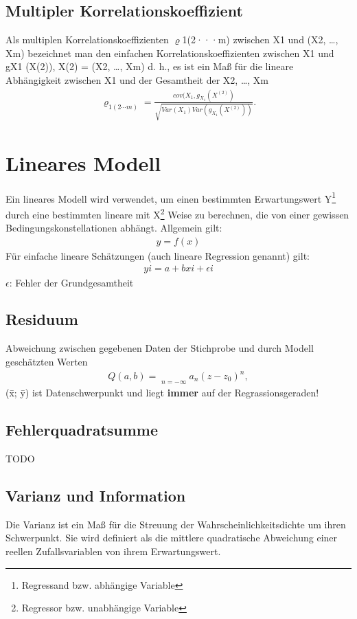 \documentclass[a4paper,10pt]{scrartcl}
\begin{document}
\subsection{Multipler Korrelationskoeffizient}
Als multiplen Korrelationskoeffizienten $\varrho$1(2···m) zwischen X1 und (X2, …, Xm) bezeichnet man den einfachen Korrelationskoeffizienten zwischen X1 und gX1 (X(2)), X(2) = (X2, …, Xm) d. h., es ist ein Maß für die lineare Abhängigkeit zwischen X1 und der Gesamtheit der X2, …, Xm
\begin{eqnarray}{\varrho }_{1(\mathrm{2\cdots}m)}=\frac{{cov}({X}_{1},{g}_{{X}_{1}}({X}^{(2)})}{\sqrt{Var({X}_{1})Var({g}_{{X}_{1}}({X}^{(2)}))}}.\end{eqnarray}
\newpage
\section{Lineares Modell}
Ein lineares Modell wird verwendet, um einen bestimmten Erwartungswert Y\footnote{Regressand bzw. abhängige Variable} durch eine bestimmten lineare mit X\footnote{Regressor bzw. unabhängige Variable} Weise zu berechnen, die von einer gewissen Bedingungskonstellationen abhängt. Allgemein gilt:
\begin{eqnarray*}
y = f(x)
\end{eqnarray*}
Für einfache lineare Schätzungen (auch lineare Regression genannt) gilt:
\begin{eqnarray*}
yi = a + bxi + \epsilon i
\end{eqnarray*}
$\epsilon$: Fehler der Grundgesamtheit
\subsection{Residuum}
Abweichung zwischen gegebenen Daten der Stichprobe und durch Modell geschätzten Werten
\begin{eqnarray*}Q(a,b)=\mathop{\sum ^{\infty }}\limits_{n=-\infty }{a}_{n}{(z-{z}_{0})}^{n},\end{eqnarray*}
(\={x}; \={y}) ist Datenschwerpunkt und liegt \textbf{immer} auf der Regrassionsgeraden!
\subsection{Fehlerquadratsumme}
TODO
\subsection{Varianz und Information}
Die Varianz ist ein Maß für die Streuung der Wahrscheinlichkeitsdichte um ihren Schwerpunkt. Sie wird definiert als die mittlere quadratische Abweichung einer reellen Zufallsvariablen von ihrem Erwartungswert.
\end{document}
